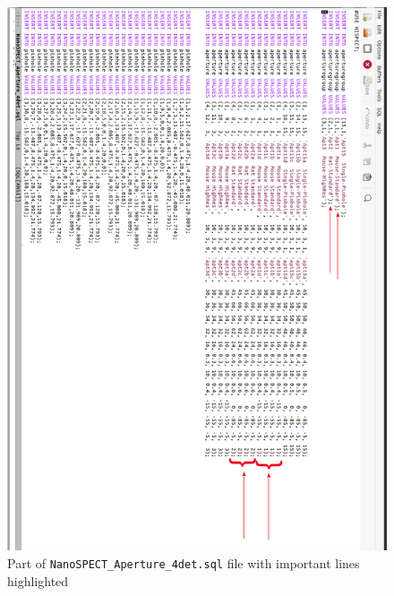 \documentclass[12pt]{article}
\begin{document}
\begin{figure}[htp]
\centering
\includegraphics[scale=0.45]{figs/HiSPECT4det.png}
\caption{Part of \texttt{NanoSPECT\_Aperture\_4det.sql} file with important lines highlighted}
\label{fig:HiSPECT4det}
\end{figure}
\end{document}
